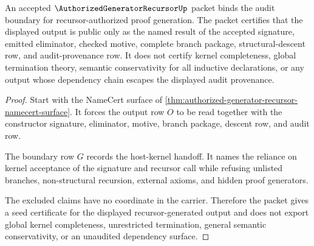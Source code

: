 \begin{theorem}
\label{thm:authorized-generator-recursor-audit-boundary}
An accepted $\AuthorizedGeneratorRecursorUp$ packet binds the audit boundary for recursor-authorized proof generation. The packet certifies that the displayed output is public only as the named result of the accepted signature, emitted eliminator, checked motive, complete branch package, structural-descent row, and audit-provenance row. It does not certify kernel completeness, global termination theory, semantic conservativity for all inductive declarations, or any output whose dependency chain escapes the displayed audit provenance.
\end{theorem}
\begin{proof}
Start with the NameCert surface of \autoref{thm:authorized-generator-recursor-namecert-surface}. It forces the output row $O$ to be read together with the constructor signature, eliminator, motive, branch package, descent row, and audit row.

The boundary row $G$ records the host-kernel handoff. It names the reliance on kernel acceptance of the signature and recursor call while refusing unlisted branches, non-structural recursion, external axioms, and hidden proof generators.

The excluded claims have no coordinate in the carrier. Therefore the packet gives a seed certificate for the displayed recursor-generated output and does not export global kernel completeness, unrestricted termination, general semantic conservativity, or an unaudited dependency surface.
\end{proof}

